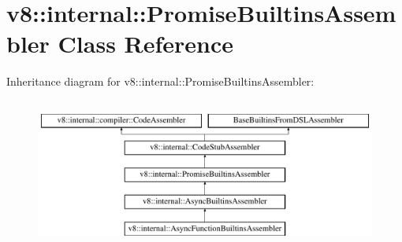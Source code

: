 \hypertarget{classv8_1_1internal_1_1PromiseBuiltinsAssembler}{}\section{v8\+:\+:internal\+:\+:Promise\+Builtins\+Assembler Class Reference}
\label{classv8_1_1internal_1_1PromiseBuiltinsAssembler}
Inheritance diagram for v8\+:\+:internal\+:\+:Promise\+Builtins\+Assembler\+:\begin{figure}[H]
\begin{center}
\leavevmode
\includegraphics[height=5.000000cm]{classv8_1_1internal_1_1PromiseBuiltinsAssembler}
\end{center}
\end{figure}
